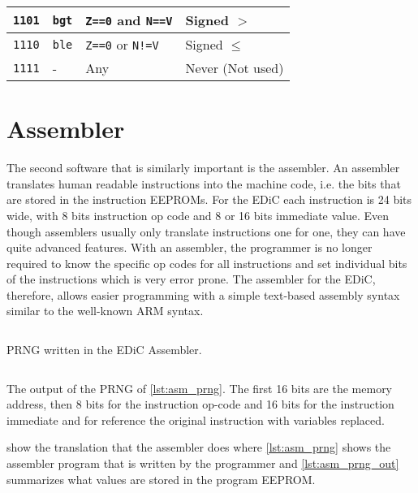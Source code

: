 \begin{table}[t]
\begin{tabularx}{\textwidth}{ |c|l|l|X| }
    \texttt{1101}           & \texttt{bgt}                         & \texttt{Z==0} and \texttt{N==V} & Signed $>$       \\\hline
    \texttt{1110}           & \texttt{ble}                         & \texttt{Z==0} or \texttt{N!=V}  & Signed $\leq$    \\\hline
    \texttt{1111}           & -                                    & Any                             & Never (Not used) \\\hline
  \end{tabularx}
\end{table}

\section{Assembler}
The second software that is similarly important is the assembler.
An assembler translates human readable instructions into the machine code, i.e. the bits that are stored in the instruction \glspl{EEPROM}.
For the \gls{EDiC} each instruction is 24 bits wide, with 8 bits instruction op code and 8 or 16 bits immediate value.
Even though assemblers usually only translate instructions one for one, they can have quite advanced features.
With an assembler, the programmer is no longer required to know the specific op codes for all instructions and set individual bits of the instructions which is very error prone.
The assembler for the \gls{EDiC}, therefore, allows easier programming with a simple text-based assembly syntax similar to the well-known ARM syntax.
\begin{listing}[t]
  \inputminted[linenos,
    breaklines,
    frame=leftline,
    xleftmargin=20pt,
  ]{ARM}{src/prng.s}
  \caption{\gls{PRNG} written in the \gls{EDiC} Assembler.}
  \label{lst:asm_prng}
\end{listing}

\begin{listing}[t]
  \inputminted[linenos,
    breaklines,
    frame=leftline,
    xleftmargin=20pt,
  ]{ARM}{src/prng_out.s}
  \caption{The output of the \gls{PRNG} of \cref{lst:asm_prng}. The first 16 bits are the memory address, then 8 bits for the instruction op-code and 16 bits for the instruction immediate and for reference the original instruction with variables replaced.}
  \label{lst:asm_prng_out}
\end{listing}

 show the translation that the assembler does where \cref{lst:asm_prng} shows the assembler program that is written by the programmer and \cref{lst:asm_prng_out} summarizes what values are stored in the program \gls{EEPROM}.

